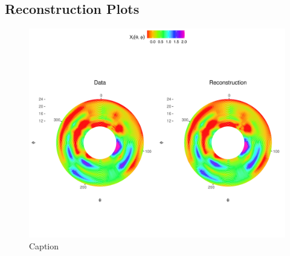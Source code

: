 \subsection{Reconstruction Plots}

\begin{figure}
    \centering
    \includegraphics[width=0.75\linewidth]{figures/eye-reconstruction.pdf}
    \caption{Caption}
    \label{fig:enter-label}
\end{figure}